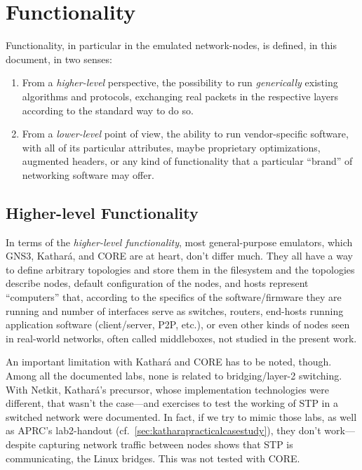 \section{Functionality}
\label{sec:comparativefunctionality}

Functionality, in particular in the emulated network-nodes, is defined, in this document, in two senses:
\begin{enumerate}
  \item From a \emph{higher-level} perspective, the possibility to run \emph{generically} existing algorithms and protocols, exchanging real packets in the respective layers according to the standard way to do so.
  \item From a \emph{lower-level} point of view, the ability to run vendor-specific software, with all of its particular attributes, maybe proprietary optimizations, augmented headers, or any kind of functionality that a particular ``brand'' of networking software may offer.
\end{enumerate}

\subsection{Higher-level Functionality}

In terms of the \emph{higher-level functionality}, most general-purpose emulators, which GNS3, Kathará, and CORE are at heart, don't differ much.
They all have a way to define arbitrary topologies and store them in the filesystem and the topologies describe nodes, default configuration of the nodes, and hosts represent ``computers'' that, according to the specifics of the software/firmware they are running and number of interfaces serve as switches, routers, end-hosts running application software (client/server, P2P, etc.), or even other kinds of nodes seen in real-world networks, often called middleboxes, not studied in the present work.

An important limitation with Kathará and CORE has to be noted, though.
Among all the documented labs, none is related to bridging/layer-2 switching.
With Netkit, Kathará's precursor, whose implementation technologies were different, that wasn't the case---and exercises to test the working of STP in a switched network were documented.
In fact, if we try to mimic those labs, as well as APRC's lab2-handout (cf.~\ref{sec:katharapracticalcasestudy}), they don't work---despite capturing network traffic between nodes shows that STP is communicating, the Linux bridges.
This was not tested with CORE.

